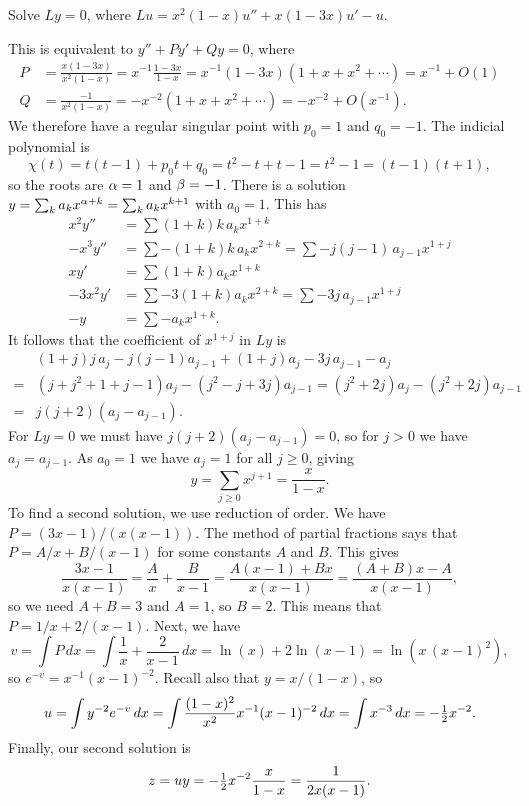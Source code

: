 \documentclass[a4paper]{amsart}
\begin{document}
\begin{exercise}\label{ex-frobenius-b}
 Solve $Ly=0$, where $Lu=x^2(1-x)u''+x(1-3x)u'-u$.
\end{exercise}
\begin{solution}
 This is equivalent to $y''+Py'+Qy=0$, where
 \begin{align*}
  P &= \frac{x(1-3x)}{x^2(1-x)} = x^{-1}\frac{1-3x}{1-x}
     = x^{-1}(1-3x)(1+x+x^2+\dotsb) = x^{-1}+O(1) \\
  Q &= \frac{-1}{x^2(1-x)} = -x^{-2}(1+x+x^2+\dotsb) 
     = -x^{-2} + O(x^{-1}).
 \end{align*}
 We therefore have a regular singular point with $p_0=1$ and
 $q_0=-1$.  The indicial polynomial is
 \[ \chi(t) = t(t-1)+p_0t+q_0 = t^2-t+t-1 = t^2-1=(t-1)(t+1), \]
 so the roots are $\alpha=1$ and $\beta=-1$.  There is a solution
 $y=\sum_ka_kx^{\alpha+k}=\sum_ka_kx^{k+1}$ with $a_0=1$.  This has
 \begin{align*}
  x^2y'' &= \sum (1+k)k\,a_k x^{1+k} \\
  -x^3y'' &= \sum -(1+k)k\,a_k x^{2+k} 
           = \sum -j(j-1)\,a_{j-1} x^{1+j} \\
  xy' &= \sum (1+k)a_k x^{1+k} \\
  -3x^2y' &= \sum -3(1+k)a_k x^{2+k} = \sum -3j\,a_{j-1}x^{1+j} \\
  -y &= \sum -a_kx^{1+k}.
 \end{align*}
 It follows that the coefficient of $x^{1+j}$ in $Ly$ is 
 \begin{align*}
  & (1+j)j\,a_j - j(j-1)a_{j-1} + (1+j)a_j-3j\,a_{j-1}-a_j \\
  =& (j+j^2+1+j-1)a_j - (j^2-j+3j)a_{j-1} 
     = (j^2+2j)a_j - (j^2+2j)a_{j-1} \\
  =& j(j+2)(a_j-a_{j-1}).
 \end{align*}
 For $Ly=0$ we must have $j(j+2)(a_j-a_{j-1})=0$, so for $j>0$ we have
 $a_j=a_{j-1}$.  As $a_0=1$ we have $a_j=1$ for all $j\geq 0$, giving 
 \[ y = \sum_{j\geq 0} x^{j+1} = \frac{x}{1-x}. \]
 To find a second solution, we use reduction of order.  We have 
 $P=(3x-1)/(x(x-1))$.  The method of partial fractions says that
 $P=A/x+B/(x-1)$ for some constants $A$ and $B$.  This gives
 \[ \frac{3x-1}{x(x-1)} = \frac{A}{x}+\frac{B}{x-1} = 
     \frac{A(x-1)+Bx}{x(x-1)} = \frac{(A+B)x-A}{x(x-1)}, 
 \]
 so we need $A+B=3$ and $A=1$, so $B=2$.  This means that
 $P=1/x+2/(x-1)$.  Next, we have
 \[ v = \int P\,dx = \int \frac{1}{x}+\frac{2}{x-1}\,dx = 
    \ln(x) + 2\ln(x-1) = \ln(x\,(x-1)^2),
 \]
 so $e^{-v}=x^{-1}(x-1)^{-2}$.  Recall also that $y=x/(1-x)$, so 
 \[ u = \int y^{-2}e^{-v}\,dx 
      = \int \frac{(1-x)^2}{x^2}x^{-1}(x-1)^{-2}\,dx
      = \int x^{-3}\,dx = -\tfrac{1}{2} x^{-2}.
 \]
 Finally, our second solution is
 \[ z=uy=-\tfrac{1}{2} x^{-2}\frac{x}{1-x} = \frac{1}{2x(x-1)}. \]
\end{solution}
\end{document}
